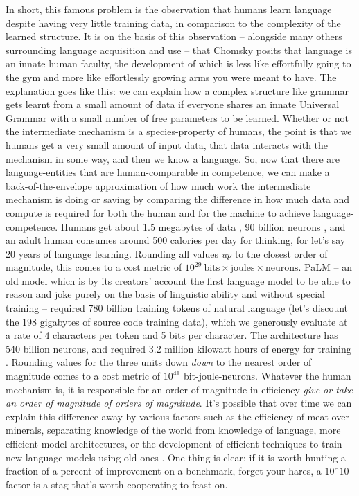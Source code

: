 \begin{fullwidth}
\begin{multicols}{2}
In short, this famous problem is the observation that humans learn language despite having very little training data, in comparison to the complexity of the learned structure. It is on the basis of this observation -- alongside many others surrounding language acquisition and use -- that Chomsky posits \citep{chomsky_new_2000} that language is an innate human faculty, the development of which is less like effortfully going to the gym and more like effortlessly growing arms you were meant to have. The explanation goes like this: we can explain how a complex structure like grammar gets learnt from a small amount of data if everyone shares an innate Universal Grammar with a small number of free parameters to be learned. Whether or not the intermediate mechanism is a species-property of humans, the point is that we humans get a very small amount of input data, that data interacts with the mechanism in some way, and then we know a language. So, now that there are language-entities that are human-comparable in competence, we can make a back-of-the-envelope approximation of how much work the intermediate mechanism is doing or saving by comparing the difference in how much data and compute is required for both the human and for the machine to achieve language-competence. Humans get about 1.5 megabytes of data \citep{mollica_humans_2019}, 90 billion neurons \citep{herculano-houzel_remarkable_2012}, and an adult human consumes around 500 calories per day for thinking, for let's say 20 years of language learning. Rounding all values \emph{up} to the closest order of magnitude, this comes to a cost metric of $10^{29} \ \text{bits} \times \text{joules} \times \text{neurons}$. PaLM -- an old model which is by its creators' account the first language model to be able to reason and joke purely on the basis of linguistic ability and without special training \citep{chowdhery_palm_2022,narang_pathways_2022} -- required 780 billion training tokens of natural language (let's discount the 198 gigabytes of source code training data), which we generously evaluate at a rate of 4 characters per token \citep{khan_what_2023} and 5 bits per character. The architecture has 540 billion neurons, and required 3.2 million kilowatt hours of energy for training \citep{tom_goldstein_tomgoldsteincs_training_2022}. Rounding values for the three units down \emph{down} to the nearest order of magnitude comes to a cost metric of $10^{41}$ bit-joule-neurons. Whatever the human mechanism is, it is responsible for an order of magnitude in efficiency \emph{give or take an order of magnitude of orders of magnitude}. It's possible that over time we can explain this difference away by various factors such as the efficiency of meat over minerals, separating knowledge of the world from knowledge of language, more efficient model architectures, or the development of efficient techniques to train new language models using old ones \citep{}. One thing is clear: if it is worth hunting a fraction of a percent of improvement on a benchmark, forget your hares, a $10ˆ10$ factor is a stag that's worth cooperating to feast on.\\


\end{multicols}
\end{fullwidth}
